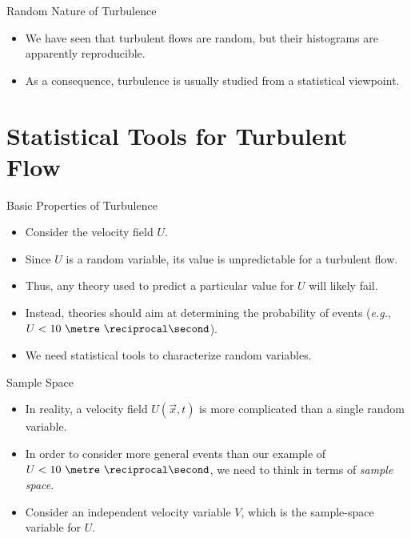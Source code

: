 
\begin{frame}{Random Nature of Turbulence}
  \begin{itemize}
  	\item We have seen that turbulent flows are random, but their histograms are apparently reproducible.
  	\item As a consequence, turbulence is usually studied from a statistical viewpoint.
  \end{itemize}
\end{frame}

\section{Statistical Tools for Turbulent Flow} %
\begin{frame}{Basic Properties of Turbulence}
\begin{itemize}
  	\item Consider the velocity field $U$.
  	\item Since $U$ is a random variable, its value is unpredictable for a turbulent flow.
  	\item Thus, any theory used to predict a particular value for $U$ will likely fail.
  	\item Instead, theories should aim at determining the probability of events (\textit{e.g.}, $U < 10\ \metre\ \reciprocal\second$).
  	\item We need statistical tools to characterize random variables.
  \end{itemize}
\end{frame}


\begin{frame}{Sample Space}
\begin{itemize}
  	\item In reality, a velocity field $U(\vec{x},t)$ is more complicated than a single random variable.
  	\item In order to consider more general events than our example of $U < 10\ \metre\ \reciprocal\second$, we need to think in terms of \textit{sample space}.
  	\item Consider an independent velocity variable $V$, which is the sample-space variable for $U$.
  \end{itemize}
\end{frame}


